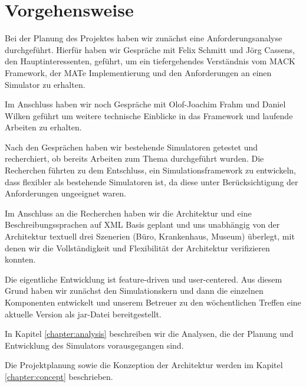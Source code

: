 
\section{Vorgehensweise}\label{sec:approach}
Bei der Planung des Projektes haben wir zunächst eine Anforderungsanalyse durchgeführt. Hierfür haben wir Gespräche mit Felix Schmitt und Jörg Cassens, den Hauptinteressenten, geführt, um ein tiefergehendes Verständnis vom MACK Framework, der MATe Implementierung und den Anforderungen an einen Simulator zu erhalten.

Im Anschluss haben wir noch Gespräche mit Olof-Joachim Frahm und Daniel Wilken geführt um weitere technische Einblicke in das Framework und laufende Arbeiten zu erhalten.

Nach den Gesprächen haben wir bestehende Simulatoren getestet und recherchiert, ob bereits Arbeiten zum Thema durchgeführt wurden. Die Recherchen führten zu dem Entschluss, ein Simulationsframework zu entwickeln, dass flexibler als bestehende Simulatoren ist, da diese unter Berücksichtigung der Anforderungen ungeeignet waren.

Im Anschluss an die Recherchen haben wir die Architektur und eine Beschreibungssprachen auf XML Basis geplant und uns unabhängig von der Architektur textuell drei Szenerien (Büro, Krankenhaus, Museum) überlegt, mit denen wir die Vollständigkeit und Flexibilität der Architektur verifizieren konnten.

Die eigentliche Entwicklung ist feature-driven und user-centered. Aus diesem Grund haben wir zunächst den Simulationskern und dann die einzelnen Komponenten entwickelt und unserem Betreuer zu den wöchentlichen Treffen eine aktuelle Version als jar-Datei bereitgestellt.



In Kapitel \ref{chapter:analysis} beschreiben wir die Analysen, die der Planung und Entwicklung des Simulators vorausgegangen sind.

Die Projektplanung sowie die Konzeption der Architektur werden im Kapitel \ref{chapter:concept} beschrieben.

